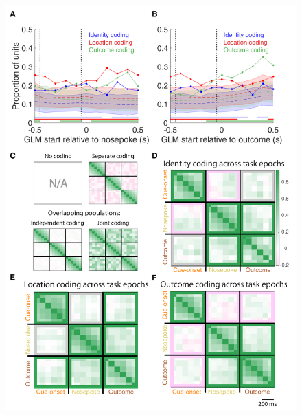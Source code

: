\documentclass[11pt]{article}
\begin{document}
 \begin{figure}[ht!]
\centering
\includegraphics[height=0.7\textheight]{Fig 7 - Q2.pdf}

\end{figure}
\end{document}
